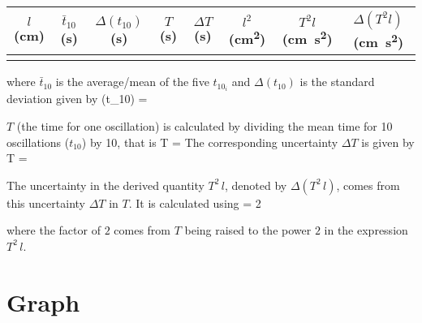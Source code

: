    \begin{table}[h]
      \centering

      \begin{tabular}{| c || c | c | c | c || c | c | c ||}

         \hline
         $l$ (\si{\centi\metre}) & $\bar{t}_{10}$ (\si{\second}) & $\Delta(t_{10})$ (\si{\second}) & $T$ (\si{\second}) & $\Delta T$ (\si{\second}) & $l^2$ (\si{\square\centi\metre}) & $T^2 l$ (\si{\centi\metre \square\second}) & $\Delta (T^2 l)$ (\si{\centi\metre \square\second}) \\

         \hline
            & & & & & & & \\
         \hline

      \end{tabular}
   \end{table}
   where $\bar{t}_{10}$ is the average/mean of the five $t_{10_i}$ and $\Delta (t_{10})$ is the standard deviation given by
   \beq \label{calc_Dt10}
      \Delta (t_{10}) = 
   \eeq
      
   
   $T$ (the time for one oscillation) is calculated by dividing the mean time for 10 oscillations ($t_{10}$) by 10, that is
   \beq \label{calc_T}
      T = 
   \eeq
   The corresponding uncertainty $\Delta T$ is given by
   \beq
      \Delta T = 
   \eeq

   The uncertainty in the derived quantity $T^2 \, l$, denoted by $\Delta (T^2 \, l)$, comes from this uncertainty $\Delta T$ in $T$. It is calculated using
   \beq \label{calc_DT2l}
       = 2 
   \eeq
   
   where the factor of $2$ comes from $T$ being raised to the power $2$ in the expression $T^2 \, l$.


\section*{Graph}

